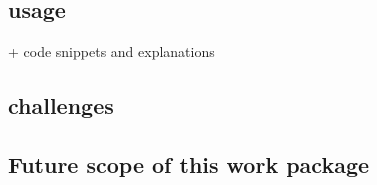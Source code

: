 \subsection{usage}

+ code snippets and explanations

\subsection{challenges}
\subsection{Future scope of this work package}



